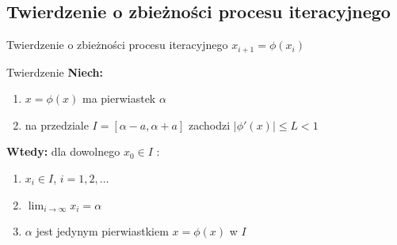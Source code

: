 \subsection{Twierdzenie o zbieżności procesu iteracyjnego}
\begin{frame}{Twierdzenie o zbieżności procesu iteracyjnego $x_{i+1} = \phi(x_{i})$}
	\begin{block}{Twierdzenie}
		\textbf{Niech:}
		\begin{enumerate}
			\item $x = \phi(x)$ ma pierwiastek $\alpha$
			\item na przedziale $I = \left[\alpha - a, \alpha + a\right]$ zachodzi $\lvert \phi'(x) \rvert \leq L < 1$
		\end{enumerate}
		\vspace{0.5cm}
		\textbf{Wtedy: } dla dowolnego $x_{0} \in I$ :
		\begin{enumerate}
			\item $x_{i} \in I$, $i = 1, 2, \ldots$
			\item $\lim_{i \rightarrow \infty} x_{i} = \alpha$
			\item $\alpha$ jest jedynym pierwiastkiem $x = \phi(x)$ w $I$
		\end{enumerate}
	\end{block}
\end{frame}

